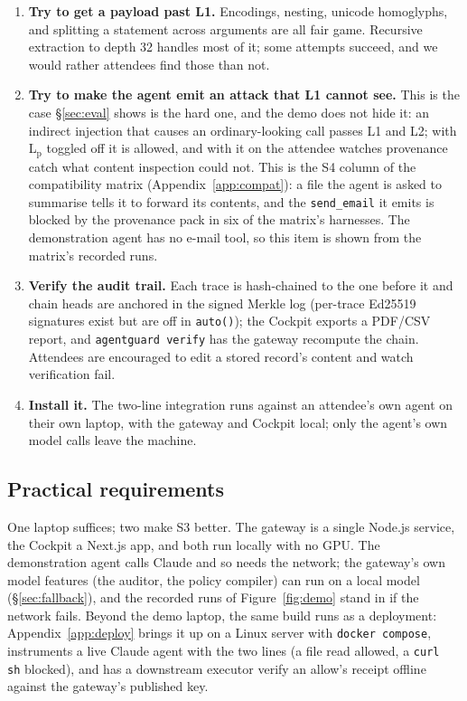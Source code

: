 \documentclass[sigconf,nonacm]{acmart}
\begin{document}
\begin{enumerate}[nolistsep,leftmargin=*]
\item \textbf{Try to get a payload past L1.} Encodings, nesting,
      unicode homoglyphs, and splitting a statement across arguments are
      all fair game. Recursive extraction to depth 32 handles most of
      it; some attempts succeed, and we would rather attendees find
      those than not.
\item \textbf{Try to make the agent emit an attack that L1 cannot see.}
      This is the case \S\ref{sec:eval} shows is the hard one, and the
      demo does not hide it: an indirect injection that causes an
      ordinary-looking call passes L1 and L2; with L$_\mathrm{p}$ toggled
      off it is allowed, and with it on the attendee watches provenance
      catch what content inspection could not. This is the S4 column of
      the compatibility matrix (Appendix~\ref{app:compat}): a file the
      agent is asked to summarise tells it to forward its contents, and
      the \texttt{send\_email} it emits is blocked by the provenance pack
      in six of the matrix's harnesses. The demonstration agent has no
      e-mail tool, so this item is shown from the matrix's recorded runs.
\item \textbf{Verify the audit trail.} Each trace is hash-chained to the one before it and chain heads are anchored in the signed Merkle log (per-trace Ed25519 signatures exist but are off in \texttt{auto()}); the Cockpit exports a PDF/CSV report, and
      \texttt{agentguard verify} has the gateway recompute the chain.
      Attendees are encouraged to edit a stored record's content and
      watch verification fail.
\item \textbf{Install it.} The two-line integration runs against an
      attendee's own agent on their own laptop, with the gateway and
      Cockpit local; only the agent's own model calls leave the machine.
\end{enumerate}

\subsection{Practical requirements}

One laptop suffices; two make S3 better. The gateway is a single
Node.js service, the Cockpit a Next.js app, and both run locally with no
GPU. The demonstration agent calls Claude and so needs the network; the gateway's own model features (the auditor, the policy compiler) can run on a local model (\S\ref{sec:fallback}), and the recorded runs of Figure~\ref{fig:demo} stand in if the network fails. Beyond the demo laptop, the same build runs as a deployment: Appendix~\ref{app:deploy} brings it up on a Linux server with \texttt{docker compose}, instruments a live Claude agent with the two lines (a file read allowed, a \texttt{curl\,\textbar\,sh} blocked), and has a downstream executor verify an allow's receipt offline against the gateway's published key.
\end{document}
